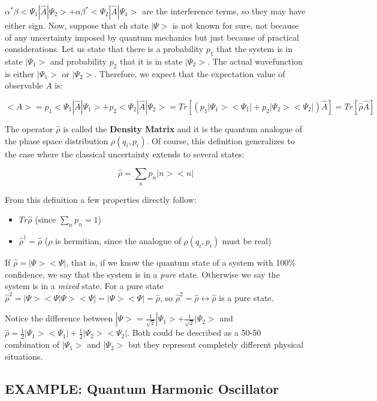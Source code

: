 \documentclass{article}
\begin{document}
$\alpha^{*}\beta<\Psi_{1}|\hat{A}|\Psi_{2}>+\alpha\beta^{*}<\Psi_{2}|\hat{A}|\Psi_{1}>$ are the interference terms, so they may have either sign.  Now, suppose that eh state $|\Psi>$ is not known for sure, not because of any uncertainty imposed by quantum mechanics but just because of practical considerations.  Let us state that there is a probability $p_{1}$ that the system is in state $|\Psi_{1}>$ and probability $p_{2}$ that it is in state $|\Psi_{2}>$.  The actual wavefunction is either $|\Psi_{1}>$ or $|\Psi_{2}>$.  Therefore, we expect that the expectation value of observable $A$ is:

$$<A>=p_{1}<\Psi_{1}|\hat{A}|\Psi_{1}>+p_{2}<\Psi_{2}|\hat{A}|\Psi_{2}>=Tr[(p_{1}|\Psi_{1}><\Psi_{1}|+p_{2}|\Psi_{2}><\Psi_{2}|)\hat{A}]=Tr[\hat{\rho}\hat{A}]$$

The operator $\hat{\rho}$ is called the \textbf{Density Matrix} and it is the quantum analogue of the phase space distribution $\rho(q_{i},p_{i})$.  Of course, this definition generalizes to the case where the classical uncertainty extends to several states:

$$\hat{\rho}=\sum_{n}p_{n}|n><n|$$

From this definition a few properties directly follow:

\begin{itemize}
	\item $Tr\hat{\rho}$ (since $\sum_{n}p_{n}=1$)
	\item $\hat{\rho}^{\dagger}=\hat{\rho}$ ($\rho$ is hermitian, since the analogue of $\rho(q_{i},p_{i})$ must be real)
\end{itemize}

If $\hat{\rho}=|\Psi><\Psi|$, that is, if we know the quantum state of a system with 100\% confidence, we say that the system is in a \textit{pure} state.  Otherwise we say the system is in a \textit{mixed} state.  For a pure state $\hat{\rho}^{2}=|\Psi><\Psi|\Psi><\Psi|=|\Psi><\Psi|=\hat{\rho}$, so $\hat{\rho}^{2}=\hat{\rho} \leftrightarrow \hat{\rho}$ is a pure state.

Notice the difference between $|\Psi>=\frac{1}{\sqrt{2}}|\Psi_{1}>+\frac{1}{\sqrt{2}}|\Psi_{2}>$ and $\hat{\rho}=\frac{1}{2}|\Psi_{1}><\Psi_{1}|+\frac{1}{2}|\Psi_{2}><\Psi_{2}|$.  Both could be described as a 50-50 combination of $|\Psi_{1}>$ and $|\Psi_{2}>$ but they represent completely different physical situations.  

\subsection{EXAMPLE: Quantum Harmonic Oscillator}
\end{document}
